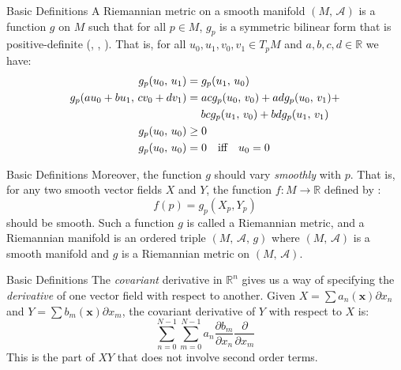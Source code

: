 \documentclass{beamer}
\begin{document}
    \begin{frame}{Basic Definitions}
        A Riemannian metric on a smooth manifold $(M,\,\mathcal{A})$ is a
        function $g$ on $M$ such that for all $p\in{M}$,
        $g_{p}$ is a symmetric bilinear form that is positive-definite
        (\cite[p.~327-328]{LeeSmoothManifolds},
        \cite[p.~196]{McInerneyDifferentialGeometry},
        \cite[p.~105]{MukherjeeDifferentialTopology}). That
        is, for all $u_{0},u_{1},v_{0},v_{1}\in{T}_{p}M$ and
        $a,b,c,d\in\mathbb{R}$ we have:
        \begin{align}
            g_{p}(u_{0},\,u_{1})
            &=g_{p}(u_{1},\,u_{0})\\
                g_{p}(au_{0}+bu_{1},\,cv_{0}+dv_{1})
            &=acg_{p}(u_{0},\,v_{0})+adg_{p}(u_{0},\,v_{1})+\nonumber\\
            &\hspace{1.3em}bcg_{p}(u_{1},\,v_{0})+bdg_{p}(u_{1},\,v_{1})\\
            g_{p}(u_{0},\,u_{0})&\geq{0}\\
            g_{p}(u_{0},\,u_{0})
            &=0\quad\textrm{iff}\quad{u}_{0}=0
        \end{align}
    \end{frame}
    \begin{frame}{Basic Definitions}
        Moreover, the function $g$ should vary \textit{smoothly} with $p$.
        That is, for any two smooth vector fields $X$ and $Y$, the function
        $f:M\rightarrow\mathbb{R}$ defined by
        \cite[p.~166,\,196]{McInerneyDifferentialGeometry}:
        \begin{equation}
            f(p)=g_{p}(X_{p},Y_{p})
        \end{equation}
        should be smooth. Such a function $g$ is called a Riemannian metric,
        and a Riemannian manifold is an ordered triple
        $(M,\,\mathcal{A},\,g)$ where $(M,\,\mathcal{A})$ is a smooth manifold
        and $g$ is a Riemannian metric on $(M,\,\mathcal{A})$.
    \end{frame}
    \begin{frame}{Basic Definitions}
        The \textit{covariant} derivative in $\mathbb{R}^{n}$ gives us a way
        of specifying the \textit{derivative} of one vector field with respect
        to another. Given $X=\sum{a}_{n}(\mathbf{x})\partial{x}_{n}$ and
        $Y=\sum{b}_{m}(\mathbf{x})\partial{x}_{m}$, the covariant derivative
        of $Y$ with respect to $X$ is:
        \begin{equation}
            \sum_{n=0}^{N-1}\sum_{m=0}^{N-1}a_{n}
                \frac{\partial{b}_{m}}{\partial{x}_{n}}
                \frac{\partial}{\partial{x}_{m}}
        \end{equation}
        This is the part of $XY$ that does not involve second order terms.
    \end{frame}
\end{document}
